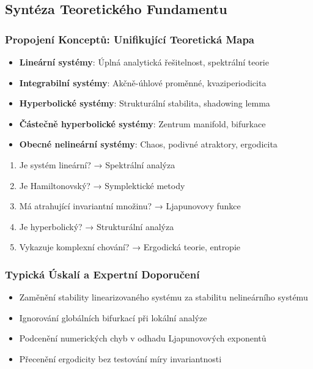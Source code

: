 \spc

\subsection{Syntéza Teoretického Fundamentu}

\subsubsection{Propojení Konceptů: Unifikující Teoretická Mapa}


\begin{keyinsight}
\begin{itemize}
\item \textbf{Lineární systémy}: Úplná analytická řešitelnost, spektrální teorie
\item \textbf{Integrabilní systémy}: Akčně-úhlové proměnné, kvaziperiodicita  
\item \textbf{Hyperbolické systémy}: Strukturální stabilita, shadowing lemma
\item \textbf{Částečně hyperbolické systémy}: Zentrum manifold, bifurkace
\item \textbf{Obecné nelineární systémy}: Chaos, podivné atraktory, ergodicita
\end{itemize}
\end{keyinsight}

\begin{application}
\begin{enumerate}
\item Je systém lineární? → Spektrální analýza
\item Je Hamiltonovský? → Symplektické metody
\item Má atrahující invariantní množinu? → Ljapunovovy funkce
\item Je hyperbolický? → Strukturální analýza
\item Vykazuje komplexní chování? → Ergodická teorie, entropie
\end{enumerate}
\end{application}

\subsubsection{Typická Úskalí a Expertní Doporučení}

\begin{warning}
\begin{itemize}
\item Zaměnění stability linearizovaného systému za stabilitu nelineárního systému
\item Ignorování globálních bifurkací při lokální analýze
\item Podcenění numerických chyb v odhadu Ljapunovových exponentů
\item Přecenění ergodicity bez testování míry invariantnosti
\end{itemize}
\end{warning}

